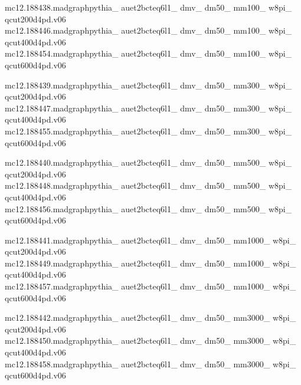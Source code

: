 mc12.188438.madgraphpythia\_ auet2bcteq6l1\_ dmv\_ dm50\_ mm100\_ w8pi\_ \\ qcut200d4pd.v06\\
mc12.188446.madgraphpythia\_ auet2bcteq6l1\_ dmv\_ dm50\_ mm100\_ w8pi\_ \\ qcut400d4pd.v06\\
mc12.188454.madgraphpythia\_ auet2bcteq6l1\_ dmv\_ dm50\_ mm100\_ w8pi\_ \\ qcut600d4pd.v06

mc12.188439.madgraphpythia\_ auet2bcteq6l1\_ dmv\_ dm50\_ mm300\_ w8pi\_ \\ qcut200d4pd.v06\\
mc12.188447.madgraphpythia\_ auet2bcteq6l1\_ dmv\_ dm50\_ mm300\_ w8pi\_ \\ qcut400d4pd.v06\\
mc12.188455.madgraphpythia\_ auet2bcteq6l1\_ dmv\_ dm50\_ mm300\_ w8pi\_ \\ qcut600d4pd.v06

mc12.188440.madgraphpythia\_ auet2bcteq6l1\_ dmv\_ dm50\_ mm500\_ w8pi\_ \\ qcut200d4pd.v06\\
mc12.188448.madgraphpythia\_ auet2bcteq6l1\_ dmv\_ dm50\_ mm500\_ w8pi\_ \\ qcut400d4pd.v06\\
mc12.188456.madgraphpythia\_ auet2bcteq6l1\_ dmv\_ dm50\_ mm500\_ w8pi\_ \\ qcut600d4pd.v06

mc12.188441.madgraphpythia\_ auet2bcteq6l1\_ dmv\_ dm50\_ mm1000\_ w8pi\_ \\ qcut200d4pd.v06\\
mc12.188449.madgraphpythia\_ auet2bcteq6l1\_ dmv\_ dm50\_ mm1000\_ w8pi\_ \\ qcut400d4pd.v06\\
mc12.188457.madgraphpythia\_ auet2bcteq6l1\_ dmv\_ dm50\_ mm1000\_ w8pi\_ \\ qcut600d4pd.v06

mc12.188442.madgraphpythia\_ auet2bcteq6l1\_ dmv\_ dm50\_ mm3000\_ w8pi\_ \\ qcut200d4pd.v06\\
mc12.188450.madgraphpythia\_ auet2bcteq6l1\_ dmv\_ dm50\_ mm3000\_ w8pi\_ \\ qcut400d4pd.v06\\
mc12.188458.madgraphpythia\_ auet2bcteq6l1\_ dmv\_ dm50\_ mm3000\_ w8pi\_ \\ qcut600d4pd.v06

